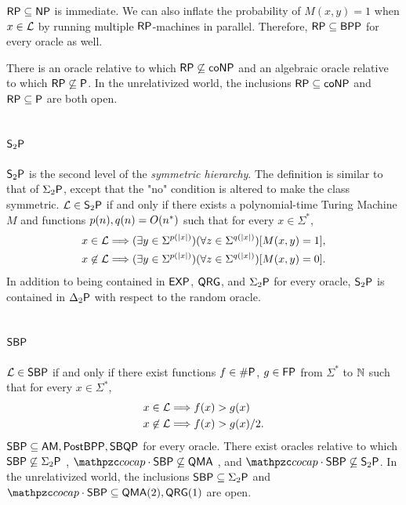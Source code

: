 $\mathsf{RP}\subseteq\mathsf{NP}$ is immediate. We can also inflate the probability of 
$M(x,y)=1$ when $x\in\mathcal{L}$ by running multiple $\mathsf{RP}$-machines in parallel. 
Therefore, $\mathsf{RP}\subseteq\mathsf{BPP}$ for every oracle as well.

There is an oracle relative to which $\mathsf{RP}\not\subseteq\mathsf{co}\mathsf{NP}$ and an 
algebraic oracle relative to which $\mathsf{RP}\not\subseteq\mathsf{P}$. In the 
unrelativized world, the inclusions $\mathsf{RP}\subseteq\mathsf{co}\mathsf{NP}$ and 
$\mathsf{RP}\subseteq\mathsf{P}$ are both open.

\subsection{$\mathsf{S}_2\mathsf{P}$}

$\mathsf{S}_2\mathsf{P}$ is the second level of the \textit{symmetric hierarchy}. The 
definition is similar to that of $\Sigma_2\mathsf{P}$, except that the "no" condition 
is altered to make the class symmetric. $\mathcal{L}\in\mathsf{S}_2\mathsf{P}$ if and only if 
there exists a polynomial-time Turing Machine $M$ and functions 
$p(n),q(n)=O(n^*)$ such that for every $x\in\Sigma^*$,
\begin{align*}
x\in\mathcal{L}&\Longrightarrow
(\exists y\in\Sigma^{p(|x|)})(\forall z\in\Sigma^{q(|x|)})[M(x,y)=1], \\
x\not\in\mathcal{L}&\Longrightarrow
(\exists y\in\Sigma^{p(|x|)})(\forall z\in\Sigma^{q(|x|)})[M(x,y)=0].
\end{align*}
In addition to being contained in $\mathsf{EXP}$, $\mathsf{QRG}$, and $\Sigma_2\mathsf{P}$ 
for every oracle, $\mathsf{S}_2\mathsf{P}$ is contained in $\Delta_2\mathsf{P}$ with respect to 
the random oracle.

\subsection{$\mathsf{SBP}$}

$\mathcal{L}\in\mathsf{SBP}$ if and only if there exist functions $f\in\#\mathsf{P}$, 
$g\in\mathsf{FP}$ from $\Sigma^*$ to $\mathbb{N}$ such that for every $x\in\Sigma^*$,
\begin{align*}
x\in\mathcal{L}&\Longrightarrow f(x)>g(x) \\
x\not\in\mathcal{L}&\Longrightarrow f(x)>g(x)/2.
\end{align*}
$\mathsf{SBP}\subseteq\mathsf{AM},\mathsf{PostBPP},\mathsf{SBQP}$ for every oracle. There 
exist oracles relative to which $\mathsf{SBP}\not\subseteq\Sigma_2\mathsf{P}$ 
\cite{bohler2003error}, $\cocap\cdot\msf{SBP}\not\subseteq\msf{QMA}$ 
\cite{aaronson2019quantum}, and 
$\cocap\cdot\msf{SBP}\not\subseteq\msf{S}_2\sP$. In the unrelativized world, 
the inclusions $\mathsf{SBP}\subseteq\Sigma_2\mathsf{P}$ and 
$\cocap\cdot\msf{SBP}\subseteq\msf{QMA}(2),\msf{QRG}(1)$ are open.

